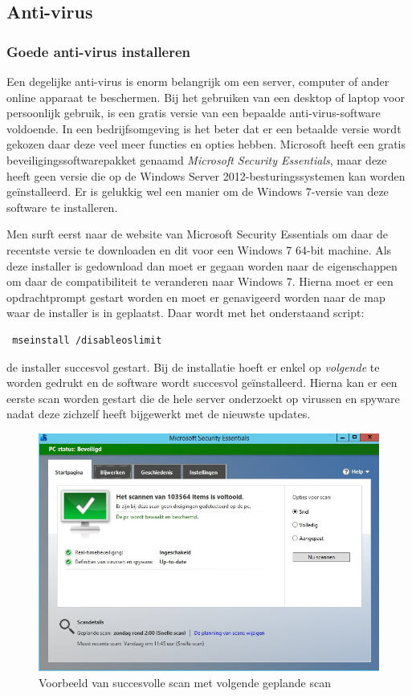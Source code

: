 \documentclass[pdftex,a4paper,12pt]{report}
\begin{document}
\subsection{Anti-virus}
\subsubsection{Goede anti-virus installeren}
Een degelijke anti-virus is enorm belangrijk om een server, computer of ander online apparaat te beschermen. Bij het gebruiken van een desktop of laptop voor persoonlijk gebruik, is een gratis versie van een bepaalde anti-virus-software voldoende. In een bedrijfsomgeving is het beter dat er een betaalde versie wordt gekozen daar deze veel meer functies en opties hebben. Microsoft heeft een gratis beveiligingssoftwarepakket genaamd \textit{Microsoft Security Essentials}, maar deze heeft geen versie die op de Windows Server 2012-besturingssystemen kan worden geïnstalleerd. Er is gelukkig wel een manier om de Windows 7-versie van deze software te installeren.

Men surft eerst naar de website van Microsoft Security Essentials om daar de recentste versie te downloaden en dit voor een Windows 7 64-bit machine. Als deze installer is gedownload dan moet er gegaan worden naar de eigenschappen om daar de compatibiliteit te veranderen naar Windows 7. Hierna moet er een opdrachtprompt gestart worden en moet er genavigeerd worden naar de map waar de installer is in geplaatst. Daar wordt met het onderstaand script:
\begin{verbatim} mseinstall /disableoslimit \end{verbatim} 
de installer succesvol gestart. Bij de installatie hoeft er enkel op \textit{volgende}  te worden gedrukt en de software wordt succesvol geïnstalleerd. Hierna kan er een eerste scan worden gestart die de hele server onderzoekt op virussen en spyware nadat deze zichzelf heeft bijgewerkt met de nieuwste updates. \citep{Herring2014}

\begin{figure}[H]
\begin{center}
\includegraphics[scale=0.60]{img/AntiVirus}
\end{center}
\caption{Voorbeeld van succesvolle scan met volgende geplande scan}
\label{img:AntiVirus}
\end{figure}
\end{document}
